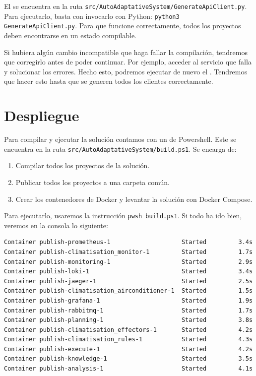 El  se encuentra en la ruta \texttt{src/AutoAdaptativeSystem/GenerateApiClient.py}. Para ejecutarlo, basta con invocarlo con Python: \texttt{python3 GenerateApiClient.py}. Para que funcione correctamente, todos los proyectos deben encontrarse en un estado compilable.

Si hubiera algún cambio incompatible que haga fallar la compilación, tendremos que corregirlo antes de poder continuar. Por ejemplo, acceder al servicio que falla y solucionar los errores. Hecho esto, podremos ejecutar de nuevo el . Tendremos que hacer esto hasta que se generen todos los clientes correctamente.

\section{Despliegue}

Para compilar y ejecutar la solución contamos con un  de Powershell. Este se encuentra en la ruta \texttt{src/AutoAdaptativeSystem/build.ps1}. Se encarga de:
\begin{enumerate}
  \item Compilar todos los proyectos de la solución.
  \item Publicar todos los proyectos a una carpeta común.
  \item Crear los contenedores de Docker y levantar la solución con Docker Compose.
\end{enumerate}

Para ejecutarlo, usaremos la instrucción \texttt{pwsh build.ps1}. Si todo ha ido bien, veremos en la consola lo siguiente:

\begin{verbatim}
Container publish-prometheus-1                    Started         3.4s
Container publish-climatisation_monitor-1         Started         1.7s
Container publish-monitoring-1                    Started         2.9s
Container publish-loki-1                          Started         3.4s
Container publish-jaeger-1                        Started         2.5s
Container publish-climatisation_airconditioner-1  Started         1.5s
Container publish-grafana-1                       Started         1.9s
Container publish-rabbitmq-1                      Started         1.7s
Container publish-planning-1                      Started         3.8s
Container publish-climatisation_effectors-1       Started         4.2s
Container publish-climatisation_rules-1           Started         4.3s
Container publish-execute-1                       Started         4.2s
Container publish-knowledge-1                     Started         3.5s
Container publish-analysis-1                      Started         4.1s
\end{verbatim}

